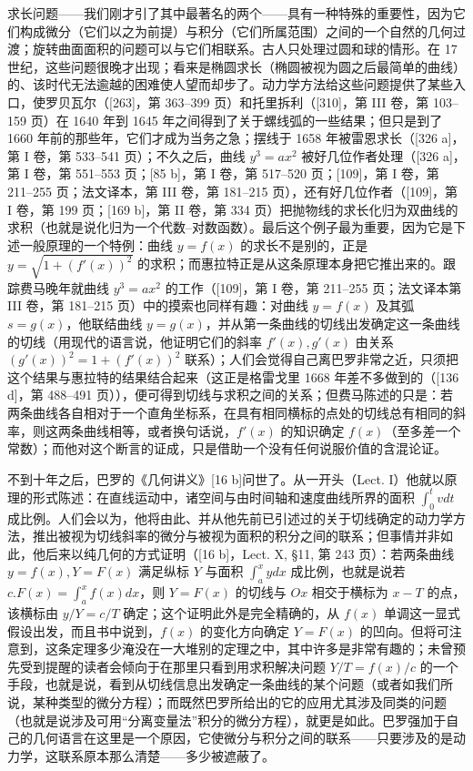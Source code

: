 求长问题——我们刚才引了其中最著名的两个——具有一种特殊的重要性，因为它们构成微分（它们以之为前提）与积分（它们所属范围）之间的一个自然的几何过渡；旋转曲面面积的问题可以与它们相联系。古人只处理过圆和球的情形。在 17 世纪，这些问题很晚才出现；看来是椭圆求长（椭圆被视为圆之后最简单的曲线）的、该时代无法逾越的困难使人望而却步了。动力学方法给这些问题提供了某些入口，使罗贝瓦尔（{[}263{]}，第 363–399 页）和托里拆利（{[}310{]}，第 III 卷，第 103–159 页）在 1640 年到 1645 年之间得到了关于螺线弧的一些结果；但只是到了 1660 年前的那些年，它们才成为当务之急；摆线于 1658 年被雷恩求长（{[}326 a{]}，第 I 卷，第 533–541 页）；不久之后，曲线 \(y^3 = ax^2\) 被好几位作者处理（{[}326 a{]}，第 I 卷，第 551–553 页；{[}85 b{]}，第 I 卷，第 517–520 页；{[}109{]}，第 I 卷，第 211–255 页；法文译本，第 III 卷，第 181–215 页），还有好几位作者（{[}109{]}，第 I 卷，第 199 页；{[}169 b{]}，第 II 卷，第 334 页）把抛物线的求长化归为双曲线的求积（也就是说化归为一个代数–对数函数）。最后这个例子最为重要，因为它是下述一般原理的一个特例：曲线 \(y = f(x)\) 的求长不是别的，正是 \(y = \sqrt{1 + (f'(x))^2}\) 的求积；而惠拉特正是从这条原理本身把它推出来的。跟踪费马晚年就曲线 \(y^3 = ax^2\) 的工作（{[}109{]}，第 I 卷，第 211–255 页；法文译本第 III 卷，第 181–215 页）中的摸索也同样有趣：对曲线 \(y = f(x)\) 及其弧 \(s = g(x)\)，他联结曲线 \(y = g(x)\)，并从第一条曲线的切线出发确定这一条曲线的切线（用现代的语言说，他证明它们的斜率 \(f'(x), g'(x)\) 由关系 \((g'(x))^2 = 1 + (f'(x))^2\) 联系）；人们会觉得自己离巴罗非常之近，只须把这个结果与惠拉特的结果结合起来（这正是格雷戈里 1668 年差不多做到的（{[}136 d{]}，第 488–491 页）），便可得到切线与求积之间的关系；但费马陈述的只是：若两条曲线各自相对于一个直角坐标系，在具有相同横标的点处的切线总有相同的斜率，则这两条曲线相等，或者换句话说，\(f'(x)\) 的知识确定 \(f(x)\)（至多差一个常数）；而他对这个断言的证成，只是借助一个没有任何说服价值的含混论证。

不到十年之后，巴罗的《几何讲义》{[}16 b{]}问世了。从一开头（Lect. I）他就以原理的形式陈述：在直线运动中，诸空间与由时间轴和速度曲线所界的面积 \(\int_{0}^{t} v dt\) 成比例。人们会以为，他将由此、并从他先前已引述过的关于切线确定的动力学方法，推出被视为切线斜率的微分与被视为面积的积分之间的联系；但事情并非如此，他后来以纯几何的方式证明（{[}16 b{]}，Lect. X, §11, 第 243 页）：若两条曲线 \(y = f(x), Y = F(x)\) 满足纵标 \(Y\) 与面积 \(\int_{a}^{x} y dx\) 成比例，也就是说若 \(c.F(x) = \int_{a}^{x} f(x) dx\)，则 \(Y = F(x)\) 的切线与 \(Ox\) 相交于横标为 \(x - T\) 的点，该横标由 \(y/Y = c/T\) 确定；这个证明此外是完全精确的，从 \(f(x)\) 单调这一显式假设出发，而且书中说到，\(f(x)\) 的变化方向确定 \(Y = F(x)\) 的凹向。但将可注意到，这条定理多少淹没在一大堆别的定理之中，其中许多是非常有趣的；未曾预先受到提醒的读者会倾向于在那里只看到用求积解决问题 \(Y/T = f(x)/c\) 的一个手段，也就是说，看到从切线信息出发确定一条曲线的某个问题（或者如我们所说，某种类型的微分方程）；而既然巴罗所给出的它的应用尤其涉及同类的问题（也就是说涉及可用“分离变量法”积分的微分方程），就更是如此。巴罗强加于自己的几何语言在这里是一个原因，它使微分与积分之间的联系——只要涉及的是动力学，这联系原本那么清楚——多少被遮蔽了。


